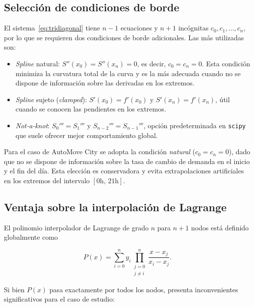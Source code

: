 \documentclass[conference]{IEEEtran}
\begin{document}
\subsection{Selección de condiciones de borde}

El sistema~\eqref{eq:tridiagonal} tiene $n-1$ ecuaciones y $n+1$ incógnitas $c_0, c_1, \ldots, c_n$, por lo que se requieren dos condiciones de borde
adicionales. Las más utilizadas son:

\begin{itemize}
    \item \textit{Spline} natural: $S''(x_0) = S''(x_n) = 0$, es decir, $c_0 = c_n = 0$. Esta condición minimiza la curvatura total de la curva y es la
      más adecuada cuando no se dispone de información sobre las derivadas en los extremos.

    \item \textit{Spline} sujeto (\textit{clamped}): $S'(x_0) = f'(x_0)$ y $S'(x_n) = f'(x_n)$, útil cuando se conocen las pendientes en los extremos.

    \item \textit{Not-a-knot}: $S_0''' = S_1'''$ y $S_{n-2}''' = S_{n-1}'''$, opción predeterminada en \texttt{scipy} que suele ofrecer mejor
      comportamiento global.
\end{itemize}

Para el caso de AutoMove City se adopta la condición \textit{natural} ($c_0 = c_n = 0$), dado que no se dispone de información sobre la tasa de cambio de
demanda en el inicio y el fin del día. Esta elección es conservadora y evita extrapolaciones artificiales en los extremos del intervalo $[0\text{h},\,
21\text{h}]$.

\subsection{Ventaja sobre la interpolación de Lagrange}

El polinomio interpolador de Lagrange de grado $n$ para $n+1$ nodos está definido globalmente como

\begin{equation}
P(x) = \sum_{i=0}^{n} y_i \prod_{\substack{j=0\\j\neq i}}^{n}
\frac{x - x_j}{x_i - x_j}.
\label{eq:lagrange}
\end{equation}

Si bien $P(x)$ pasa exactamente por todos los nodos, presenta inconvenientes significativos para el caso de estudio:
\end{document}
